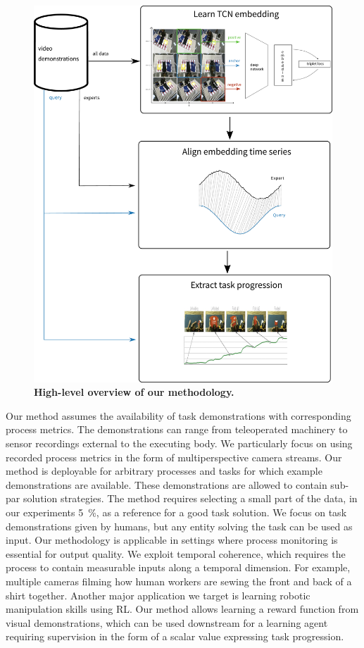 \documentclass[\home/main.tex]{subfiles}
\begin{document}
\begin{figure}[htbp]
    \centering
    \includegraphics[width=\textwidth]{figures/fig_complete_overview.eps}
    \caption{{\textbf{High-level overview of our methodology.}}}
    \label{fig:rewards_overview_framework}
\end{figure}

Our method assumes the availability of task demonstrations with corresponding process metrics. The demonstrations can range from teleoperated machinery to sensor recordings external to the executing body. We particularly focus on using recorded process metrics in the form of multiperspective camera streams. Our method is deployable for arbitrary processes and tasks for which example demonstrations are available. These demonstrations are allowed to contain sub-par solution strategies. The method requires selecting a small part of the data, in our experiments \qty{5}{\percent}, as a reference for a good task solution. We focus on task demonstrations given by humans, but any entity solving the task can be used as input. Our methodology is applicable in settings where process monitoring is essential for output quality. We exploit temporal coherence, which requires the process to contain measurable inputs along a temporal dimension.
For example, multiple cameras filming how human workers are sewing the front and back of a shirt together.
Another major application we target is learning robotic manipulation skills using RL. Our method allows learning a reward function from visual demonstrations, which can be used downstream for a learning agent requiring supervision in the form of a scalar value expressing task progression.
\end{document}
